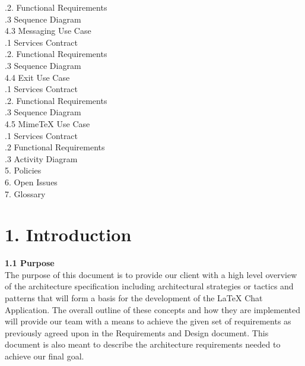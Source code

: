 \documentclass[29pt,a4paper]{moderncv}
\begin{document}
\begin{tabbing}
.2. Functional Requirements \\
.3 Sequence Diagram \\
4.3 Messaging Use Case \> \\
.1 Services Contract \\
.2. Functional Requirements \\
.3 Sequence Diagram \\
4.4 Exit Use Case \> \\
.1 Services Contract \\
.2. Functional Requirements \\
.3 Sequence Diagram \\
4.5 MimeTeX Use Case \\
.1 Services Contract \\
.2 Functional Requirements  \\
.3 Activity Diagram \\
5. Policies \> 			\\					
6. Open Issues \> 			\\				
7. Glossary \>  			\\				

\end{tabbing}
\newpage
	\section*{\textbf{1. Introduction}}
	\vspace{4mm}
	
		\textbf{1.1 Purpose}
			\\The purpose of this document is to provide our client with a high level overview of the architecture specification including architectural strategies or tactics and patterns that will form a basis for the development of the LaTeX Chat Application. The overall outline of these concepts and how they are implemented will provide our team with a means to achieve the given set of requirements as previously agreed upon in the Requirements and Design document. This document is also meant to describe the architecture requirements needed to achieve our final goal.\\
		\vspace{1mm}
		
\end{document}
